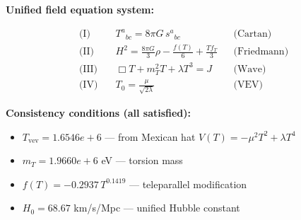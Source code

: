 
\textbf{Unified field equation system:}

\begin{align}
  \text{(I)} \quad & T^a{}_{bc} = 8\pi G \, s^a{}_{bc} && \text{(Cartan)} \\
  \text{(II)} \quad & H^2 = \frac{8\pi G}{3}\rho - \frac{f(T)}{6} + \frac{Tf_T}{3} && \text{(Friedmann)} \\
  \text{(III)} \quad & \Box T + m_T^2 T + \lambda T^3 = J && \text{(Wave)} \\
  \text{(IV)} \quad & T_0 = \frac{\mu}{\sqrt{2\lambda}} && \text{(VEV)}
\end{align}

\textbf{Consistency conditions (all satisfied):}
\begin{itemize}
  \item $T_{\text{vev}} = 1.6546e+6$ — from Mexican hat $V(T) = -\mu^2 T^2 + \lambda T^4$
  \item $m_T = 1.9660e+6$ eV — torsion mass
  \item $f(T) = -0.2937 \, T^{0.1419}$ — teleparallel modification
  \item $H_0 = 68.67$ km/s/Mpc — unified Hubble constant
\end{itemize}